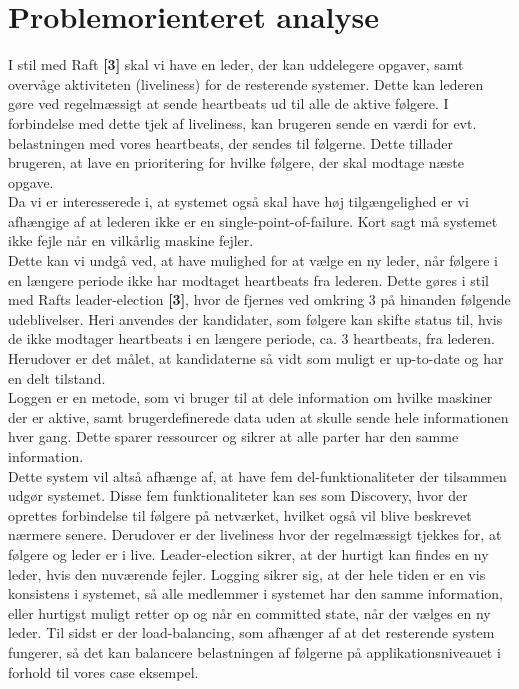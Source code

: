 \documentclass[a4paper,12pt]{article}
\begin{document}
\section{Problemorienteret analyse}
I stil med Raft \textbf{[3]} skal vi have en leder, der kan uddelegere opgaver, samt overvåge aktiviteten (liveliness) for de resterende systemer. Dette kan lederen gøre ved regelmæssigt at sende heartbeats ud til alle de aktive følgere. I forbindelse med dette tjek af liveliness, kan brugeren sende en værdi for evt. belastningen med vores heartbeats, der sendes til følgerne. Dette tillader brugeren, at lave en prioritering for hvilke følgere, der skal modtage næste opgave.
\\
Da vi er interesserede i, at systemet også skal have høj tilgængelighed er vi afhængige af at lederen ikke er en single-point-of-failure. Kort sagt må systemet ikke fejle når en vilkårlig maskine fejler.
\\[5px]
Dette kan vi undgå ved, at have mulighed for at vælge en ny leder, når følgere i en længere periode ikke har modtaget heartbeats fra lederen. Dette gøres i stil med Rafts leader-election \textbf{[3]}, hvor de fjernes ved omkring 3 på hinanden følgende udeblivelser. Heri anvendes der kandidater, som følgere kan skifte status til, hvis de ikke modtager heartbeats i en længere periode, ca. 3 heartbeats, fra lederen. Herudover er det målet, at kandidaterne så vidt som muligt er up-to-date og har en delt tilstand. 
\\
Loggen er en metode, som vi bruger til at dele information om hvilke maskiner der er aktive, samt brugerdefinerede data uden at skulle sende hele informationen hver gang. Dette sparer ressourcer og sikrer at alle parter har den samme information.
\\[5px]
Dette system vil altså afhænge af, at have fem del-funktionaliteter der tilsammen udgør systemet. Disse fem funktionaliteter kan ses som Discovery, hvor der oprettes forbindelse til følgere på netværket, hvilket også vil blive beskrevet nærmere senere. Derudover er der liveliness hvor der regelmæssigt tjekkes for, at følgere og leder er i live. Leader-election sikrer, at der hurtigt kan findes en ny leder, hvis den nuværende fejler. Logging sikrer sig, at der hele tiden er en vis konsistens i systemet, så alle medlemmer i systemet har den samme information, eller hurtigst muligt retter op og når en committed state, når der vælges en ny leder. Til sidst er der load-balancing, som afhænger af at det resterende system fungerer, så det kan balancere belastningen af følgerne på applikationsniveauet i forhold til vores case eksempel.
\end{document}
